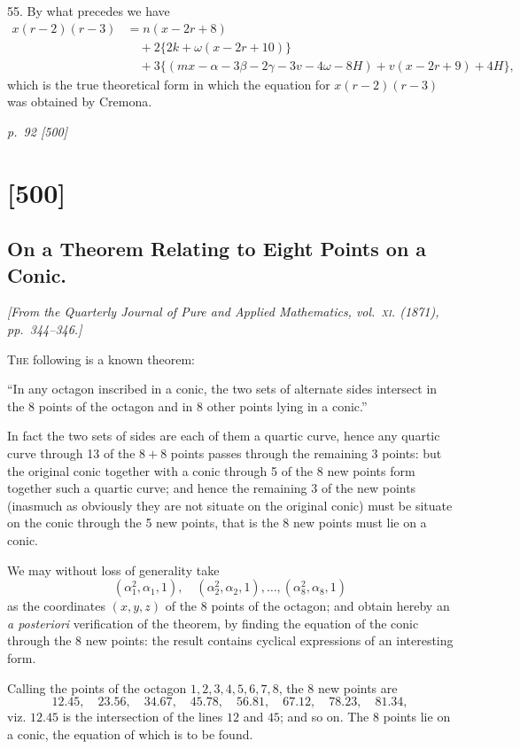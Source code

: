 \documentclass[11pt,a4paper]{article}
\newcommand{\sourcepage}[2]{%
  \bigskip
  \noindent\textit{p.~#1 [#2]}%
  \par\smallskip
}
\newcommand{\papersection}[2]{%
  \section{[#1]}
  \subsection{#2}
}
\newcommand{\fromjournal}[1]{%
  \begin{center}\textit{#1}\end{center}
}
\begin{document}
55. By what precedes we have
\[
\begin{aligned}
x(r-2)(r-3)
&=n(x-2r+8)\\
&\quad+2\{2k+\omega(x-2r+10)\}\\
&\quad+3\{(mx-\alpha-3\beta-2\gamma-3v-4\omega-8H)
+v(x-2r+9)+4H\},
\end{aligned}
\]
which is the true theoretical form in which the equation for \(x(r-2)(r-3)\) was
obtained by Cremona.

\clearpage
\sourcepage{92}{500}
\papersection{500}{On a Theorem Relating to Eight Points on a Conic.}

\fromjournal{[From the Quarterly Journal of Pure and Applied Mathematics, vol.~\textsc{xi}. (1871), pp.~344--346.]}

\textsc{The} following is a known theorem:

``In any octagon inscribed in a conic, the two sets of alternate sides intersect in
the 8 points of the octagon and in 8 other points lying in a conic.''

In fact the two sets of sides are each of them a quartic curve, hence any quartic
curve through 13 of the $8+8$ points passes through the remaining 3 points: but the
original conic together with a conic through 5 of the 8 new points form together
such a quartic curve; and hence the remaining 3 of the new points (inasmuch as
obviously they are not situate on the original conic) must be situate on the conic
through the 5 new points, that is the 8 new points must lie on a conic.

We may without loss of generality take
\[
(\alpha_1^2,\alpha_1,1),\quad (\alpha_2^2,\alpha_2,1),\ldots,
(\alpha_8^2,\alpha_8,1)
\]
as the coordinates $(x,y,z)$ of the 8 points of the octagon; and obtain hereby an
\textit{a posteriori} verification of the theorem, by finding the equation of the conic
through the 8 new points: the result contains cyclical expressions of an interesting
form.

Calling the points of the octagon $1,2,3,4,5,6,7,8$, the 8 new points are
\[
12.45,\quad 23.56,\quad 34.67,\quad 45.78,\quad
56.81,\quad 67.12,\quad 78.23,\quad 81.34,
\]
viz. $12.45$ is the intersection of the lines $12$ and $45$; and so on. The
8 points lie on a conic, the equation of which is to be found.
\end{document}
